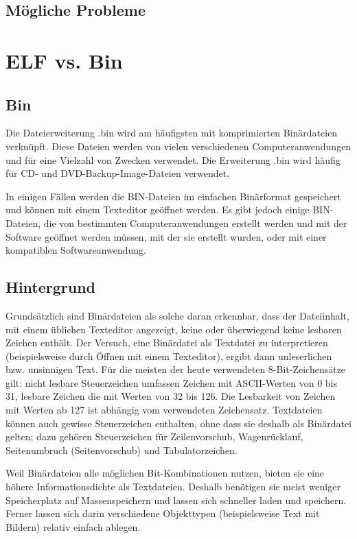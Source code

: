 \subsection{Mögliche Probleme}

\section{ELF vs. Bin}

\subsection{Bin}
Die Dateierweiterung .bin wird am häufigsten mit komprimierten Binärdateien verknüpft. Diese Dateien werden von vielen verschiedenen Computeranwendungen und für eine Vielzahl von Zwecken verwendet. Die Erweiterung .bin wird häufig für CD- und DVD-Backup-Image-Dateien verwendet.

In einigen Fällen werden die BIN-Dateien im einfachen Binärformat gespeichert und können mit einem Texteditor geöffnet werden. Es gibt jedoch einige BIN-Dateien, die von bestimmten Computeranwendungen erstellt werden und mit der Software geöffnet werden müssen, mit der sie erstellt wurden, oder mit einer kompatiblen Softwareanwendung.\cite{file.org_bin}

\subsection{Hintergrund}
Grundsätzlich sind Binärdateien als solche daran erkennbar, dass der Dateiinhalt, mit einem üblichen Texteditor angezeigt, keine oder überwiegend keine lesbaren Zeichen enthält. Der Versuch, eine Binärdatei als Textdatei zu interpretieren (beispielsweise durch Öffnen mit einem Texteditor), ergibt dann unleserlichen bzw. unsinnigen Text. Für die meisten der heute verwendeten 8-Bit-Zeichensätze gilt: nicht lesbare Steuerzeichen umfassen Zeichen mit ASCII-Werten von 0 bis 31, lesbare Zeichen die mit Werten von 32 bis 126. Die Lesbarkeit von Zeichen mit Werten ab 127 ist abhängig vom verwendeten Zeichensatz. Textdateien können auch gewisse Steuerzeichen enthalten, ohne dass sie deshalb als Binärdatei gelten; dazu gehören Steuerzeichen für Zeilenvorschub, Wagenrücklauf, Seitenumbruch (Seitenvorschub) und Tabulatorzeichen.

Weil Binärdateien alle möglichen Bit-Kombinationen nutzen, bieten sie eine höhere Informationsdichte als Textdateien. Deshalb benötigen sie meist weniger Speicherplatz auf Massenspeichern und lassen sich schneller laden und speichern. Ferner lassen sich darin verschiedene Objekttypen (beispielsweise Text mit Bildern) relativ einfach ablegen.

